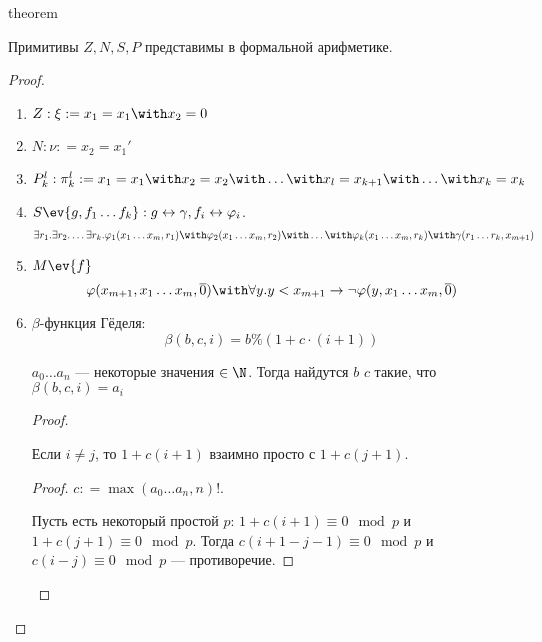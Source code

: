 \setcounter{theorem}{24}
\begin{subtheorem}{theorem}
    \begin{theorem}
        Примитивы \(Z, N, S, P\) представимы в формальной арифметике.
    \end{theorem}
    \begin{proof}\itemfix
        \begin{enumerate}
            \item \(Z : \xi : = x_1 = x_1 \with x_2 = 0\)
            \item \(N : \nu : = x_2 = x_1'\)
            \item \(P_k^l : \pi_k^l : = x_1 = x_1 \with x_2 = x_2 \with \dots \with x_l = x_{k+1} \with \dots \with x_k = x_k\)
            \item \(S\ev{g, f_1 \dots f_k} : g \leftrightarrow \gamma, f_i \leftrightarrow \varphi_i\).
                  \[\exists r_1.\exists r_2.\dots \exists r_k.\varphi_1(x_1 \dots x_m, r_1) \with \varphi_2(x_1\dots x_m, r_2) \with \dots \with \varphi_k(x_1 \dots x_m, r_k) \with \gamma(r_1 \dots r_k, x_{m+1})\]
                  \setcounter{enumi}{5}
            \item \(M\ev{f}\)
                  \[\varphi(x_{m+1}, x_1 \dots x_m, \overline 0) \with \forall y.y < x_{m+1} \to \neg \varphi(y, x_1 \dots x_m, \overline 0)\]
                  \setcounter{enumi}{4}
            \item \(\beta\)-функция Гёделя:
                  \[\beta(b, c, i) = b \% (1 + c \cdot (i + 1))\]
                  \begin{theorem}
                      \(a_0 \dots a_n\) --- некоторые значения \(\in \N\). Тогда найдутся \(b \) \(c\) такие, что \(\beta(b, c, i) = a_i\)
                  \end{theorem}
                  \begin{proof}
                      \begin{statement}
                          Если \(i \neq j\), то \(1 + c(i + 1)\) взаимно просто с \(1 + c(j + 1)\).
                      \end{statement}

                      \begin{proof}
                          \(c : = \max(a_0 \dots a_n, n)!\).

                          Пусть есть некоторый простой \(p\): \(1 + c(i + 1) \equiv 0 \mod p\) и \(1 + c(j + 1) \equiv 0 \mod p\). Тогда \(c(i + 1 - j - 1) \equiv 0 \mod p\) и \(c(i - j) \equiv 0 \mod p\) --- противоречие.
                      \end{proof}


\end{proof}
\end{enumerate}
\end{proof}
\end{subtheorem}
